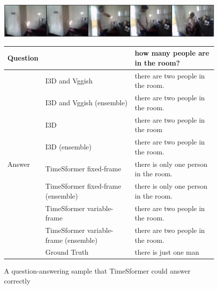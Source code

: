 \documentclass[letterpaper]{article} %
\begin{document}
\begin{figure}[t]
 \centering
 \includegraphics[width=\textwidth]{./fig/DUHFG.png}
 \begin{tabular}{lll} \hline
  Question & & how many people are in the room? \\ \hline
  \multirow{9}{*}{Answer} & I3D and Vggish \cite{Li2021bridging} & there are two people in the room.\\
  & I3D and Vggish (ensemble) & there are two people in the room.\\
  & I3D & there are two people in the room\\
  & I3D (ensemble) & there are two people in the room.\\
  & TimeSformer fixed-frame & there is only one person in the room.\\
  & TimeSformer fixed-frame (ensemble) & there is only one person in the room.\\
  & TimeSformer variable-frame & there are two people in the room.\\
  & TimeSformer variable-frame (ensemble) & there are two people in the room.\\
  & Ground Truth & there is just one man \\ \hline
 \end{tabular}
 \caption{A question-answering sample that TimeSformer could answer correctly}
 \label{fig:good_sample}
\end{figure}
\end{document}
